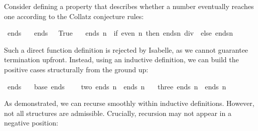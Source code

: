 Consider defining a property that describes whether a number eventually reaches one according to the Collatz conjecture rules:

\begin{isabellebody} \isanewline
{}\isamarkupfalse%
\ ends{\kern0pt}\ \isanewline
\ \ {\isachardoublequoteopen}ends{\kern0pt}\ {}{\kern0pt}\ {\isacharequal}{\kern0pt}\ True{\isachardoublequoteclose}\ {\isacharbar}{\kern0pt}\isanewline
\ \ {\isachardoublequoteopen}ends{\kern0pt}\ n\ {\isacharequal}{\kern0pt}\ {\isacharparenleft}{\kern0pt}if\ {\isacharparenleft}{\kern0pt}even\ n{\isacharparenright}{\kern0pt}\ then\ ends{\isacharparenleft}{\kern0pt}n\ div\ {}{\isacharparenright}{\kern0pt}\ else\ ends{\isacharparenleft}{\kern0pt}{}{\isacharasterisk}{\kern0pt}n\ {\isacharplus}{\kern0pt}\ {}{\isacharparenright}{\kern0pt}{\isacharparenright}{\kern0pt}{\isachardoublequoteclose}\isanewline
%
\ \ \ \isanewline
\end{isabellebody}


Such a direct function definition is rejected by Isabelle, as we cannot guarantee termination upfront.
Instead, using an inductive definition, we can build the positive cases structurally from the ground up:

\begin{isabellebody} \isanewline
{}\isamarkupfalse%
\ ends\ \isanewline
\ \ base{\isacharcolon}{\kern0pt}\ {\isachardoublequoteopen}ends\ {}{\isachardoublequoteclose}\ {\isacharbar}{\kern0pt}\isanewline
\ \ two{\isacharcolon}{\kern0pt}\ {\isachardoublequoteopen}ends\ n\ {\isacharequal}{\kern0pt}{\isacharequal}{\kern0pt}{\isachargreater}{\kern0pt}\ ends\ {\isacharparenleft}{\kern0pt}{}{\isacharasterisk}{\kern0pt}n{\isacharparenright}{\kern0pt}{\isachardoublequoteclose}\ {\isacharbar}{\kern0pt}\isanewline
\ \ three{\isacharcolon}{\kern0pt}\ {\isachardoublequoteopen}ends\ {\isacharparenleft}{\kern0pt}{}{\isacharasterisk}{\kern0pt}n{\isacharplus}{\kern0pt}{}{\isacharparenright}{\kern0pt}\ {\isacharequal}{\kern0pt}{\isacharequal}{\kern0pt}{\isachargreater}{\kern0pt}\ ends\ n{\isachardoublequoteclose}\isanewline
\end{isabellebody}

As demonstrated, we can recurse smoothly within inductive definitions.
However, not all structures are admissible.
Crucially, recursion may not appear in a negative position:

